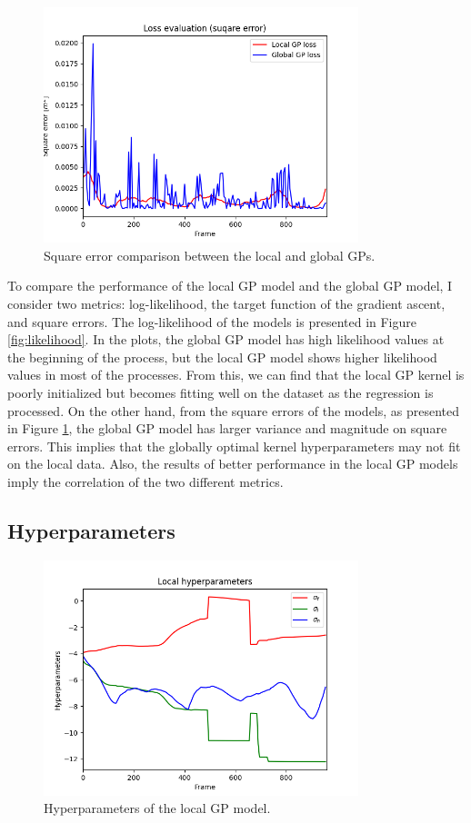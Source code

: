 \documentclass[conference]{IEEEtran}
\begin{document}
\begin{figure}[!t]
	\centering
	\includegraphics[width=3.6in]{square_error.png}	
	\caption{Square error comparison between the local and global GPs.}
	\label{fig:square_error}
\end{figure}

To compare the performance of the local GP model and the global GP model, I consider two metrics: log-likelihood, the target function of the gradient ascent, and square errors.
The log-likelihood of the models is presented in Figure \ref{fig:likelihood}.
In the plots, the global GP model has high likelihood values at the beginning of the process, but the local GP model shows higher likelihood values in most of the processes.
From this, we can find that the local GP kernel is poorly initialized but becomes fitting well on the dataset as the regression is processed.
On the other hand, from the square errors of the models, as presented in Figure \ref{fig:square_error}, the global GP model has larger variance and magnitude on square errors.
This implies that the globally optimal kernel hyperparameters may not fit on the local data.
Also, the results of better performance in the local GP models imply the correlation of the two different metrics.


\subsection{Hyperparameters}

\begin{figure}[!t]
	\centering
	\includegraphics[width=3.6in]{hyper.png}	
	\caption{Hyperparameters of the local GP model.}
	\label{fig:hyper}
\end{figure}
\end{document}
